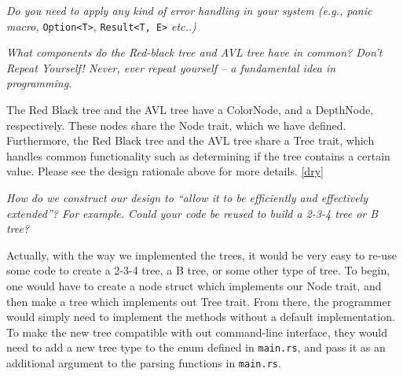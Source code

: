 \documentclass[letterpaper]{article}
\begin{document}
\textit{Do you need to apply any kind of error handling in your system (e.g.,
panic macro,}
\verb|Option<T>|, \verb|Result<T, E>| \textit{etc..)}

\textit{What components do the Red-black tree and AVL tree have in common? Don’t Repeat
Yourself! Never, ever repeat yourself – a fundamental idea in programming.}

The Red Black tree and the AVL tree have a ColorNode, and a DepthNode,
respectively. These nodes share the Node trait, which we have defined.
Furthermore, the Red Black tree and the AVL tree share a Tree trait, which
handles common functionality such as determining if the tree contains a certain
value.
Please see the design rationale above for more details. \ref{dry}

\textit{How do we construct our design to “allow it to be efficiently and
effectively extended”? For example. Could your code be reused to build a 2-3-4
tree or B tree?}

Actually, with the way we implemented the trees, it would be very easy to re-use
some code to create a 2-3-4 tree, a B tree, or some other type of tree. To
begin, one would have to create a node struct which implements our Node trait,
and then make a tree which implements out Tree trait. From there, the programmer
would simply need to implement the methods without a default implementation.
To make the new tree compatible with out command-line interface, they would need
to add a new tree type to the enum defined in \texttt{main.rs}, and pass it
as an additional argument to the parsing functions in \texttt{main.rs}.


\end{document}
